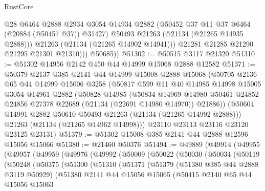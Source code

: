 \begin{lexlean}{RustCore}
\begin{coremodule}
                  @28
                  @6464
                  @2888
                  @2934
                  @3054
                  @14934
                  @2882
                  (@50452 @37 @11 @37 @6464 (@20884 (@50457 @37)) @31427)
                  @50493
                  @21263
                  (@21134 (@21265 @14935 @2888)))
                @21263
                (@21134 (@21265 @14902 @14941)))
              @21281
              @21285
              @21290
              @21295
              @21301
              @21310)))
        @50685))
@51302 := @50515 @3117 @21320
@51310 := @51302 @14956 @2142 @450 @44 @14999 @15068 @2888 @12582
@51371 := @50379
    @2137
    @385
    @2141
    @44
    @14999
    @15008
    @2888
    @15068
    (@50705
      @2136
      @65
      @44
      @14999
      @15006
      @3258
      (@50817
        @599
        @11
        @40
        @14985
        @14998
        @15005
        @3054
        @14961
        @2882
        (@50828
          @14985
          (@50834
            @14969
            @14980
            @50461
            @24852
            @24856
            @27378
            @22689
            (@21134 (@22691 @14980 @14970))
            @21886))
        (@50604 @14991 @2882 @50610 @50493 @21263 (@21134 (@21265 @14992 @2888)))
        @21263
        (@21134 (@21265 @14962 @14998)))
      @23110
      @23113
      @23116
      @23120
      @23125
      @23131)
@51379 := @51302 @15008 @385 @2141 @44 @2888 @12596 @15056 @15066
@51380 := @21460 @50376
@51494 := @49889
    (@49914
      (@49955
        (@49957
          (@49959
            (@49976
              (@49992
                (@50009
                  (@50022
                    (@50030
                      (@50034
                        (@50119
                          (@50248
                            (@50375
                              (@51300
                                (@51310
                                  (@51371
                                    (@51379
                                      (@51380 @385 @44 @2888 @3119 @50929)
                                      (@51380
                                        @2141
                                        @44
                                        @15056
                                        @15065
                                        (@50415
                                          @2140
                                          @65
                                          @44
                                          @15056
                                          @15063

\end{coremodule}
\end{lexlean}
